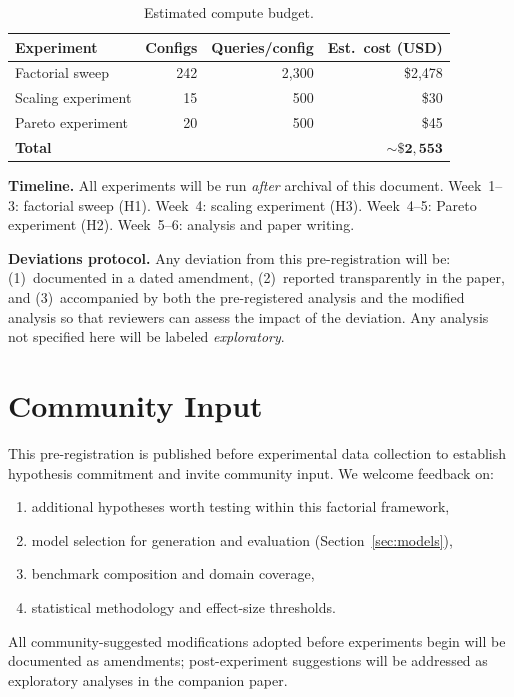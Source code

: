 \documentclass[11pt]{article}
\begin{document}
\begin{table}[h]
\centering
\footnotesize
\caption{Estimated compute budget.}
\label{tab:budget}
\begin{tabular}{@{}lrrr@{}}
\toprule
Experiment & Configs & Queries/config & Est.\ cost (USD) \\
\midrule
Factorial sweep     & 242 & 2{,}300 & \$2{,}478 \\
Scaling experiment  & 15  & 500     & \$30 \\
Pareto experiment   & 20  & 500     & \$45 \\
\midrule
\textbf{Total}      &     &         & $\mathbf{\sim\$2{,}553}$ \\
\bottomrule
\end{tabular}
\end{table}

\textbf{Timeline.}
All experiments will be run \textit{after} archival of this document.
Week~1--3: factorial sweep (H1).
Week~4: scaling experiment (H3).
Week~4--5: Pareto experiment (H2).
Week~5--6: analysis and paper writing.

\textbf{Deviations protocol.}
Any deviation from this pre-registration will be: (1)~documented in a
dated amendment, (2)~reported transparently in the paper, and
(3)~accompanied by both the pre-registered analysis and the modified
analysis so that reviewers can assess the impact of the deviation.
Any analysis not specified here will be labeled \textit{exploratory}.

\section*{Community Input}

This pre-registration is published before experimental data collection
to establish hypothesis commitment and invite community input.
We welcome feedback on:
\begin{enumerate}[nosep,leftmargin=1.5em]
  \item additional hypotheses worth testing within this factorial
    framework,
  \item model selection for generation and evaluation
    (Section~\ref{sec:models}),
  \item benchmark composition and domain coverage,
  \item statistical methodology and effect-size thresholds.
\end{enumerate}
All community-suggested modifications adopted before experiments begin
will be documented as amendments; post-experiment suggestions will be
addressed as exploratory analyses in the companion paper.



\end{document}
